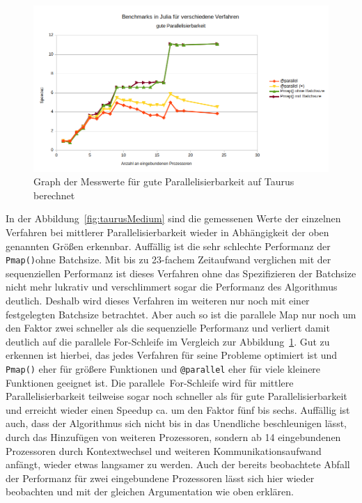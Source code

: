 \documentclass[proseminar,german,utf8]{zihpub}
\begin{document}
\begin{figure}
    \centering
    \includegraphics[scale=1, width=17cm]{bilder/parallel_performance_taurus_good.png} 
    \caption{Graph der Messwerte für gute Parallelisierbarkeit auf Taurus berechnet}
    \label{fig:taurusGood}
\end{figure}

In der Abbildung~\ref{fig:taurusMedium} sind die gemessenen Werte der einzelnen Verfahren bei mittlerer Parallelisierbarkeit wieder in Abhängigkeit der oben genannten Größen erkennbar. Auffällig ist die sehr schlechte Performanz der \verb|Pmap()|ohne Batchsize. Mit bis zu 23-fachem Zeitaufwand verglichen mit der sequenziellen Performanz ist dieses Verfahren ohne das Spezifizieren der Batchsize nicht mehr lukrativ und verschlimmert sogar die Performanz des Algorithmus deutlich. Deshalb wird dieses Verfahren im weiteren nur noch mit einer festgelegten Batchsize betrachtet. Aber auch so ist die parallele Map nur noch um den Faktor zwei schneller als die sequenzielle Performanz und verliert damit deutlich auf die parallele For-Schleife im Vergleich zur Abbildung~\ref{fig:taurusGood}. Gut zu erkennen ist hierbei, das jedes Verfahren für seine Probleme optimiert ist und \verb|Pmap()| eher für größere Funktionen und \verb|@parallel| eher für viele kleinere Funktionen geeignet ist. Die parallele~For-Schleife wird für mittlere Parallelisierbarkeit teilweise sogar noch schneller als für gute Parallelisierbarkeit und erreicht wieder einen Speedup ca. um den Faktor fünf bis sechs. Auffällig ist auch, dass der Algorithmus sich nicht bis in das Unendliche beschleunigen lässt, durch das Hinzufügen von weiteren Prozessoren, sondern ab 14 eingebundenen Prozessoren durch Kontextwechsel und weiteren Kommunikationsaufwand anfängt, wieder etwas langsamer zu werden. Auch der bereits beobachtete Abfall der Performanz für zwei eingebundene Prozessoren lässt sich hier wieder beobachten und mit der gleichen Argumentation wie oben erklären.
\end{document}
